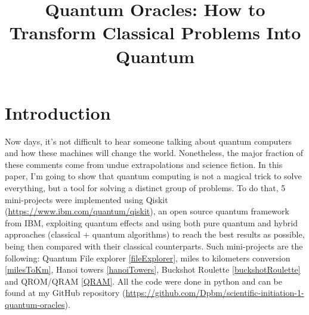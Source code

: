\documentclass[sn-mathphys-num]{sn-jnl}
\begin{document}
\title[Article Title]{Quantum Oracles: How to Transform Classical Problems Into Quantum}


\author*[1]{ }

\author[2]{ }

\author[3]{ }








\maketitle

\section{Introduction}\label{introduction}

Now days, it's not difficult to hear someone talking about quantum computers and how these machines will change the world. Nonetheless, the major fraction of these comments come from undue extrapolations and science fiction. In this paper, I'm going to show that quantum computing is not a magical trick to solve everything, but a tool for solving a distinct group of problems.
To do that, 5 mini-projects were implemented using Qiskit (\url{https://www.ibm.com/quantum/qiskit}), an open source quantum framework from IBM, exploiting quantum effects and using both pure quantum and hybrid approaches (classical + quantum algorithms) to reach the best results as possible, being then compared with their classical counterparts. Such mini-projects are the following: Quantum File explorer \ref{fileExplorer}, miles to kilometers conversion \ref{milesToKm}, Hanoi towers \ref{hanoiTowers}, Buckshot Roulette \ref{buckshotRoulette} and QROM/QRAM \ref{QRAM}. All the code were done in python and can be found at my GitHub repository (\url{https://github.com/Dpbm/scientific-initiation-1-quantum-oracles}).
\end{document}
